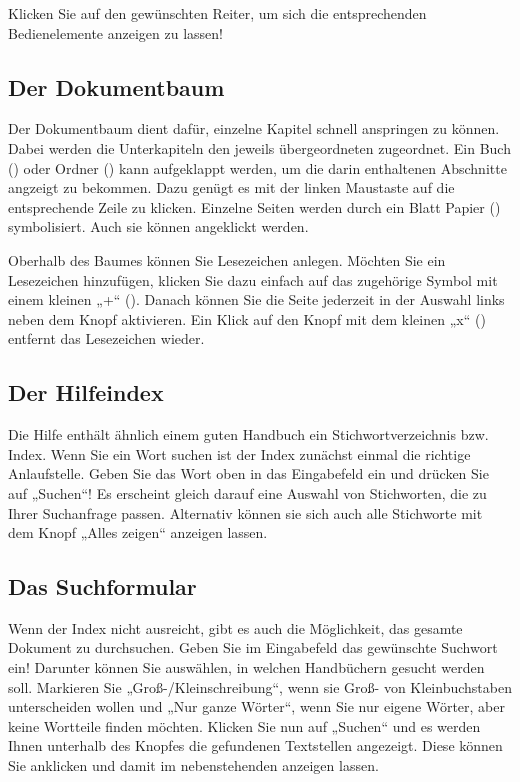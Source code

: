 Klicken Sie auf den gewünschten Reiter, um sich die entsprechenden
Bedienelemente anzeigen zu lassen!

\subsection{Der Dokumentbaum}

Der Dokumentbaum dient dafür, einzelne Kapitel schnell anspringen zu
können. Dabei werden die Unterkapiteln den jeweils übergeordneten
zugeordnet. Ein Buch () oder Ordner
() kann aufgeklappt werden, um die darin
enthaltenen Abschnitte angzeigt zu bekommen. Dazu genügt es mit der
linken Maustaste auf die entsprechende Zeile zu klicken. Einzelne
Seiten werden durch ein Blatt Papier
() symbolisiert. Auch sie können
angeklickt werden.

Oberhalb des Baumes können Sie Lesezeichen anlegen. Möchten Sie ein
Lesezeichen hinzufügen, klicken Sie dazu einfach auf das zugehörige
Symbol mit einem kleinen „+“
(). Danach können Sie die Seite
jederzeit in der Auswahl links neben dem Knopf aktivieren. Ein Klick
auf den Knopf mit dem kleinen „x“ ()
entfernt das Lesezeichen wieder.

\subsection{Der Hilfeindex}

Die Hilfe enthält ähnlich einem guten Handbuch ein
Stichwortverzeichnis bzw. Index. Wenn Sie ein Wort suchen ist der Index zunächst einmal die richtige Anlaufstelle. Geben Sie das Wort oben in das Eingabefeld ein und drücken Sie auf „Suchen“! Es erscheint gleich darauf eine Auswahl von Stichworten, die zu Ihrer Suchanfrage passen. Alternativ können sie sich auch alle Stichworte mit dem Knopf „Alles zeigen“ anzeigen lassen.

\subsection{Das Suchformular}

Wenn der Index nicht ausreicht, gibt es auch die Möglichkeit, das
gesamte Dokument zu durchsuchen. Geben Sie im Eingabefeld das
gewünschte Suchwort ein! Darunter können Sie auswählen, in welchen
Handbüchern gesucht werden soll. Markieren Sie
„Groß-/Kleinschreibung“, wenn sie Groß- von Kleinbuchstaben
unterscheiden wollen und „Nur ganze Wörter“, wenn Sie nur eigene
Wörter, aber keine Wortteile finden möchten. Klicken Sie nun auf
„Suchen“ und es werden Ihnen unterhalb des Knopfes die gefundenen
Textstellen angezeigt. Diese können Sie anklicken und damit im
nebenstehenden  anzeigen
lassen.

